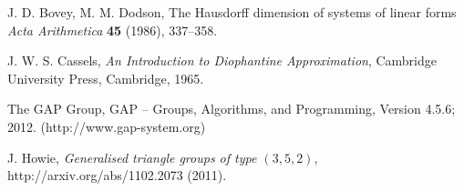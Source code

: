 \documentclass[12pt]{article}  %
\theoremstyle{definition}
\theoremstyle{remark}
\begin{document}
%
%
%
\begin{thebibliography}{99}

% 
%



%
J. D. Bovey, M. M. Dodson,                         %
The Hausdorff dimension of systems of linear forms %
{\em Acta Arithmetica}                             %
{\bf 45}                                           %
(1986), 337--358.                                   %

%
J. W. S. Cassels,                                  %
{\em An Introduction to Diophantine Approximation},%
Cambridge University Press, Cambridge, 1965.       %

%
The GAP Group, GAP -- Groups, Algorithms, and Programming,  %
Version 4.5.6; 2012. %
(http://www.gap-system.org)  %


%
J. Howie,                                            %
{\em Generalised triangle groups of type $(3,5,2)$}, %
http://arxiv.org/abs/1102.2073                       %
(2011).                                              %
\end{thebibliography}
\end{document}
